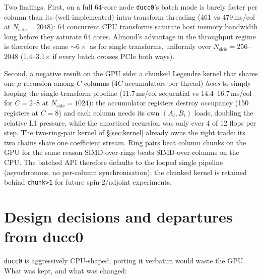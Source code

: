 \documentclass[11pt]{article}
\begin{document}
\begin{center}

\end{center}

Two findings.  First, on a full 64-core node \texttt{ducc0}'s batch mode is
barely faster per column than its (well-implemented) intra-transform
threading (461 vs 479\,ms/col at $N_\mathrm{side}=2048$): 64 concurrent
CPU transforms saturate host memory bandwidth long before they saturate
64 cores.  Almond's advantage in the throughput regime is therefore the same
$\sim\!6\times$ as for single transforms, uniformly over
$N_\mathrm{side} = 256$--$2048$ (1.4--3.1$\times$ if every batch crosses
PCIe both ways).

Second, a negative result on the GPU side: a chunked Legendre kernel that
shares one $\mu$ recursion among $C$ columns (4$C$ accumulators per
thread) \emph{loses} to simply looping the single-transform pipeline
(11.7\,ms/col sequential vs 14.4--16.7\,ms/col for $C = 2$--$8$ at
$N_\mathrm{side}=1024$): the accumulator registers destroy occupancy (150
registers at $C=8$) and each column needs its own $(A_i,B_i)$ loads,
doubling the relative L1 pressure, while the amortised recursion was only
ever 4 of 12 flops per step.  The two-ring-pair kernel of
\S\ref{sec:kernel} already owns the right trade: its two chains share one
coefficient stream.  Ring pairs beat column chunks on the GPU for the same
reason SIMD-over-rings beats SIMD-over-columns on the CPU.  The batched
API therefore defaults to the looped single pipeline (asynchronous, no
per-column synchronisation); the chunked kernel is retained behind
\texttt{chunk>1} for future spin-2/adjoint experiments.

\section{Design decisions and departures from ducc0}
\label{sec:departures}

\texttt{ducc0} is aggressively CPU-shaped; porting it verbatim would waste
the GPU.  What was kept, and what was changed:
\end{document}
